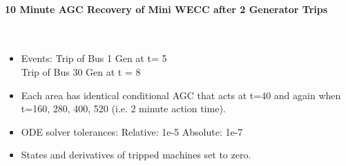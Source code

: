 \documentclass[12pt]{article}
\begin{document}
\onehalfspacing
\paragraph{10 Minute AGC Recovery of Mini WECC after 2 Generator Trips} \ \\

\begin{minipage}{0.5\linewidth}
\begin{itemize}
\raggedright
\item Events: Trip of Bus 1 Gen at t= 5\\ Trip of Bus 30 Gen at t = 8

\item Each area has identical conditional AGC that acts at t=40 and again when t=160, 280, 400, 520 (i.e. 2 minute action time).

\item ODE solver tolerances:
\subitem Relative: 1e-5
\subitem Absolute: 1e-7

\item States and derivatives of tripped machines set to zero.

\end{itemize}
\vfill
\end{minipage}\hspace{2em}%
\end{document}
